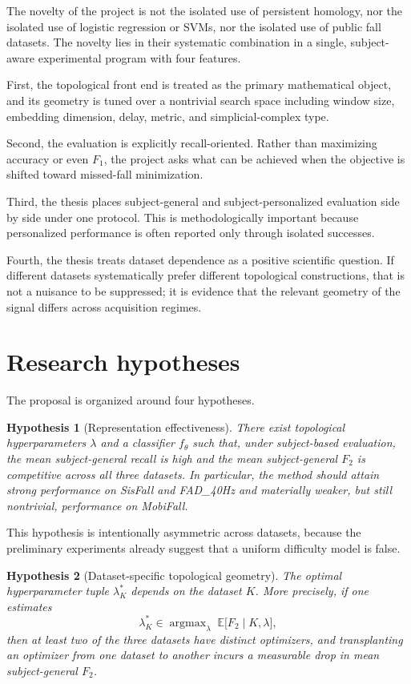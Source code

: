 \documentclass[11pt]{article}
\newtheorem{hypothesis}{Hypothesis}[section]
\DeclareMathOperator{\argmax}{argmax}
\newcommand{\E}{\mathbb E}
\newcommand{\1}{\mathbf 1}
\begin{document}
The novelty of the project is not the isolated use of persistent homology, nor the isolated use of logistic regression or SVMs, nor the isolated use of public fall datasets. The novelty lies in their systematic combination in a single, subject-aware experimental program with four features.

First, the topological front end is treated as the primary mathematical object, and its geometry is tuned over a nontrivial search space including window size, embedding dimension, delay, metric, and simplicial-complex type.

Second, the evaluation is explicitly recall-oriented. Rather than maximizing accuracy or even $F_1$, the project asks what can be achieved when the objective is shifted toward missed-fall minimization.

Third, the thesis places subject-general and subject-personalized evaluation side by side under one protocol. This is methodologically important because personalized performance is often reported only through isolated successes.

Fourth, the thesis treats dataset dependence as a positive scientific question. If different datasets systematically prefer different topological constructions, that is not a nuisance to be suppressed; it is evidence that the relevant geometry of the signal differs across acquisition regimes.

\section{Research hypotheses}

The proposal is organized around four hypotheses.

\begin{hypothesis}[Representation effectiveness]\label{hyp:effectiveness}
There exist topological hyperparameters $\lambda$ and a classifier $f_\theta$ such that, under subject-based evaluation, the mean subject-general recall is high and the mean subject-general $F_2$ is competitive across all three datasets. In particular, the method should attain strong performance on SisFall and FAD\_40Hz and materially weaker, but still nontrivial, performance on MobiFall.
\end{hypothesis}

This hypothesis is intentionally asymmetric across datasets, because the preliminary experiments already suggest that a uniform difficulty model is false.

\begin{hypothesis}[Dataset-specific topological geometry]\label{hyp:dataset-specific}
The optimal hyperparameter tuple $\lambda^\ast_K$ depends on the dataset $K$. More precisely, if one estimates
\[
  \lambda^\ast_K\in \argmax_\lambda \; \E\bigl[F_2\mid K,\lambda\bigr],
\]
then at least two of the three datasets have distinct optimizers, and transplanting an optimizer from one dataset to another incurs a measurable drop in mean subject-general $F_2$.
\end{hypothesis}
\end{document}

